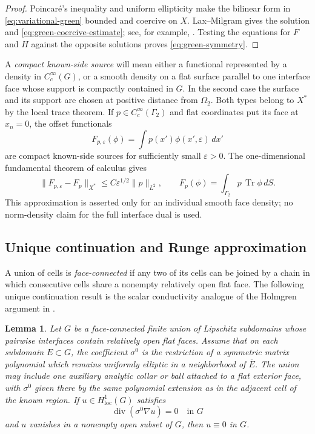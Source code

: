 \documentclass[10pt,a4paper]{amsart}
\newtheorem{lemma}[theorem]{Lemma}
\newcommand{\diver}{\operatorname{div}}
\begin{document}
\begin{proof}
Poincar\'e's inequality and uniform ellipticity make the bilinear form in
\eqref{eq:variational-green} bounded and coercive on \(X\).  Lax--Milgram gives
the solution and \eqref{eq:green-coercive-estimate}; see, for example,
\cite[Chapter 6]{Evans2010}.  Testing the equations for \(F\) and \(H\) against
the opposite solutions proves \eqref{eq:green-symmetry}.
\end{proof}

A \emph{compact known-side source} will mean either a functional represented
by a density in \(C_c^\infty(G)\), or a smooth density on a flat surface
parallel to one interface face whose support is compactly contained in \(G\).
In the second case the surface and its support are chosen at positive distance
from \(\Omega_2\).  Both types belong to \(X^*\) by the local trace theorem.  If
\(p\in C_c^\infty(\Gamma_2)\) and flat coordinates put its face at \(x_n=0\),
the offset functionals
\begin{equation}
  F_{p,\varepsilon}(\phi)
  =\int p(x')\phi(x',\varepsilon)\,dx'
  \label{eq:offset-source}
\end{equation}
are compact known-side sources for sufficiently small \(\varepsilon>0\).  The
one-dimensional fundamental theorem of calculus gives
\begin{equation}
  \|F_{p,\varepsilon}-F_p\|_{X^*}
  \le C\varepsilon^{1/2}\|p\|_{L^2},
  \qquad
  F_p(\phi)=\int_{\Gamma_2}p\,\operatorname{Tr}\phi\,dS .
  \label{eq:offset-source-limit}
\end{equation}
This approximation is asserted only for an individual smooth face density; no
norm-density claim for the full interface dual is used.

\subsection{Unique continuation and Runge approximation}

A union of cells is \emph{face-connected} if any two of its cells can be joined
by a chain in which consecutive cells share a nonempty relatively open flat
face.  The following unique continuation result is the scalar conductivity
analogue of the Holmgren argument in \cite{CarsteaHondaNakamura2018}.

\begin{lemma}
\label{lem:piecewise-poly-ucp}
Let \(G\) be a face-connected finite union of Lipschitz subdomains whose
pairwise interfaces contain relatively open flat faces.  Assume that on each
subdomain \(E\subset G\), the coefficient \(\sigma^0\) is the restriction of a
symmetric matrix polynomial which remains uniformly elliptic in a neighborhood
of \(\overline E\).  The union may include one auxiliary analytic collar or
ball attached to a flat exterior face, with \(\sigma^0\) given there by the same
polynomial extension as in the adjacent cell of the known region.  If
\(u\in H^1_{\mathrm{loc}}(G)\) satisfies
\begin{equation}
  \diver(\sigma^0\nabla u)=0\quad\text{in }G
\end{equation}
and \(u\) vanishes in a nonempty open subset of \(G\), then \(u\equiv0\) in
\(G\).
\end{lemma}
\end{document}

